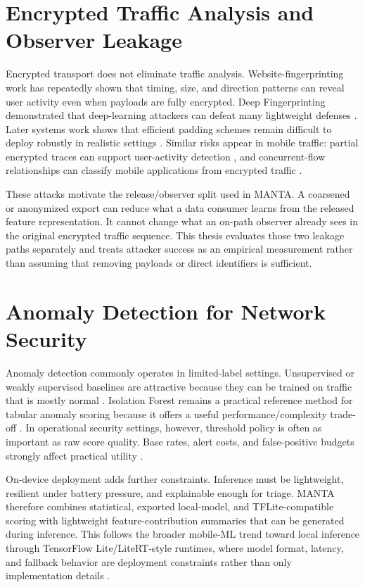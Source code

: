 \section{Encrypted Traffic Analysis and Observer Leakage}
Encrypted transport does not eliminate traffic analysis. Website-fingerprinting work has repeatedly
shown that timing, size, and direction patterns can reveal user activity even when payloads are fully
encrypted. Deep Fingerprinting demonstrated that deep-learning attackers can defeat many
lightweight defenses \citep{deep_fingerprinting_2018}. Later systems work shows that efficient
padding schemes remain difficult to deploy robustly in realistic settings \citep{wf_sok_2022}.
Similar risks appear in mobile traffic: partial encrypted traces can support user-activity detection
\citep{cnn_user_activity_2022}, and concurrent-flow relationships can classify mobile applications
from encrypted traffic \citep{gat_mobile_app_2023}.

These attacks motivate the release/observer split used in MANTA. A coarsened or anonymized export
can reduce what a data consumer learns from the released feature representation. It cannot change
what an on-path observer already sees in the original encrypted traffic sequence. This thesis
evaluates those two leakage paths separately and treats attacker success as an empirical measurement
rather than assuming that removing payloads or direct identifiers is sufficient.

\section{Anomaly Detection for Network Security}
Anomaly detection commonly operates in limited-label settings. Unsupervised or weakly supervised
baselines are attractive because they can be trained on traffic that is mostly normal
\citep{chandola_2009}. Isolation Forest remains a practical reference method for tabular anomaly
scoring because it offers a useful performance/complexity trade-off \citep{isolation_forest_2008}.
In operational security settings, however, threshold policy is often as important as raw score
quality. Base rates, alert costs, and false-positive budgets strongly affect practical utility
\citep{sommer_paxson_2010}.

On-device deployment adds further constraints. Inference must be lightweight, resilient under
battery pressure, and explainable enough for triage. MANTA therefore combines statistical,
exported local-model, and TFLite-compatible scoring with lightweight feature-contribution summaries
that can be generated during inference. This follows the broader mobile-ML trend toward local
inference through TensorFlow Lite/LiteRT-style runtimes, where model format, latency, and fallback
behavior are deployment constraints rather than only implementation details \citep{litert_overview}.

